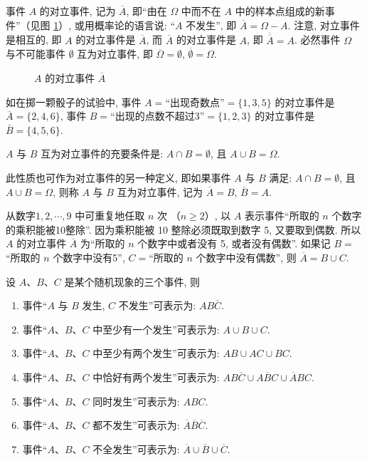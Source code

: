 事件 $A$ 的对立事件,
记为 $\overline{A}$,
即“由在 $\Omega$ 中而不在 $A$ 中的样本点组成的新事件”（见图 \ref{fig1.1.8}）,
或用概率论的语言说:
“$A$ 不发生”,
即 $\overline{A} = \Omega - A$.
注意,
对立事件是相互的,
即 $A$ 的对立事件是 $\overline{A}$,
而 $\overline{A}$ 的对立事件是 $A$,
即 $\overline{\overline{A}}=A$.
必然事件 $\Omega$ 与不可能事件 $\emptyset$ 互为对立事件,
即 $\overline{\Omega} = \emptyset$,
$\overline{\emptyset} = \Omega$.

\begin{figure}[!ht]
  \centering
  \caption{$A$ 的对立事件 $\overline{A}$}\label{fig1.1.8}
\end{figure}

如在掷一颗骰子的试验中,
事件 $A=$“出现奇数点”$= \{1,3,5\}$ 的对立事件是 $\overline{A} = \{2,4,6\}$,
事件 $B=$“出现的点数不超过3”$= \{1,2,3\}$ 的对立事件是 $\bar B =
\{4,5,6\}$.

$A$ 与 $B$ 互为对立事件的充要条件是:
$A \cap B = \emptyset$,
且 $A \cup B = \Omega$.

此性质也可作为对立事件的另一种定义,
即如果事件 $A$ 与 $B$ 满足:
$A \cap B = \emptyset$,
且 $A \cup B = \Omega$,
则称 $A$ 与 $B$ 互为对立事件,
记为 $\overline{A} = B$,
$\overline{B} = A$.

\begin{example}
  从数字$ 1, 2,\cdots, 9$ 中可重复地任取 $n$ 次 （$n \ge 2$）,
  以 $A$ 表示事件“所取的 $n$ 个数字的乘积能被10整除”.
  因为乘积能被 10 整除必须既取到数字 5,
  又要取到偶数.
  所以 $A$ 的对立事件 $\overline{A}$ 为“所取的 $n$ 个数字中或者没有 5,
  或者没有偶数”.
  如果记 $B=$“所取的 $n$ 个数字中没有5”,
  $C=$“所取的 $n$ 个数字中没有偶数”,
  则 $\overline{A} = B \cup C$.
\end{example}

\begin{example}
  设 $A$、$B$、$C$ 是某个随机现象的三个事件,
  则
  \begin{enumerate}
    \item 事件“$A$ 与 $B$ 发生,
    $C$ 不发生”可表示为: $AB\overline{C}$.
    \item 事件“$A$、$B$、$C$ 中至少有一个发生”可表示为: $A \cup B \cup C$.
    \item 事件“$A$、$B$、$C$ 中至少有两个发生”可表示为: $AB \cup AC \cup BC$.
    \item 事件“$A$、$B$、$C$ 中恰好有两个发生”可表示为: $AB\overline{C} \cup A\overline{B}C \cup \overline{A}BC$.
    \item 事件“$A$、$B$、$C$ 同时发生”可表示为: $ABC$.
    \item 事件“$A$、$B$、$C$ 都不发生”可表示为: $\overline{A}\overline{B}\overline{C}$.
    \item 事件“$A$、$B$、$C$ 不全发生”可表示为: $\overline{A} \cup \overline{B} \cup \overline{C}$.
  \end{enumerate}
\end{example}

